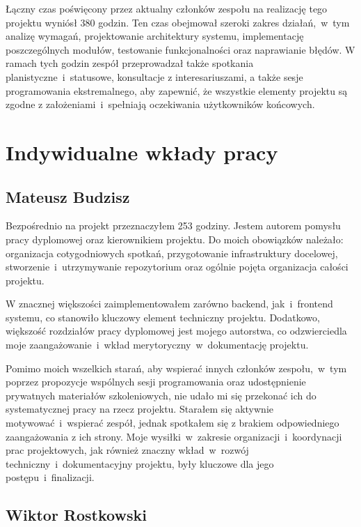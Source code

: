 Łączny czas poświęcony przez aktualny członków zespołu na realizację tego projektu wyniósł 380 godzin.
Ten czas obejmował szeroki zakres działań,~w~tym analizę wymagań, projektowanie architektury systemu, implementację poszczególnych modułów, testowanie funkcjonalności oraz naprawianie błędów.
W ramach tych godzin zespół przeprowadzał także spotkania planistyczne~i~statusowe, konsultacje z interesariuszami, a także sesje programowania ekstremalnego, aby zapewnić, że wszystkie elementy projektu są zgodne z założeniami~i~spełniają oczekiwania użytkowników końcowych.

\section{Indywidualne wkłady pracy}
\label{sec:indywidualne-wklady-pracy}

\subsection{Mateusz Budzisz}
\label{subsec:mateusz-budzisz}

Bezpośrednio na projekt przeznaczyłem 253 godziny.
Jestem autorem pomysłu pracy dyplomowej oraz kierownikiem projektu.
Do moich obowiązków należało: organizacja cotygodniowych spotkań, przygotowanie infrastruktury docelowej, stworzenie~i~utrzymywanie repozytorium oraz ogólnie pojęta organizacja całości projektu.

W znacznej większości zaimplementowałem zarówno backend, jak~i~frontend systemu, co stanowiło kluczowy element techniczny projektu.
Dodatkowo, większość rozdziałów pracy dyplomowej jest mojego autorstwa, co odzwierciedla moje zaangażowanie~i~wkład merytoryczny~w~dokumentację projektu.

Pomimo moich wszelkich starań, aby wspierać innych członków zespołu,~w~tym poprzez propozycje wspólnych sesji programowania oraz udostępnienie prywatnych materiałów szkoleniowych, nie udało mi się przekonać ich do systematycznej pracy na rzecz projektu.
Starałem się aktywnie motywować~i~wspierać zespół, jednak spotkałem się z brakiem odpowiedniego zaangażowania z ich strony.
Moje wysiłki~w~zakresie organizacji~i~koordynacji prac projektowych, jak również znaczny wkład~w~rozwój techniczny~i~dokumentacyjny projektu, były kluczowe dla jego postępu~i~finalizacji.

\subsection{Wiktor Rostkowski}
\label{subsec:wiktor-rostkowski}

